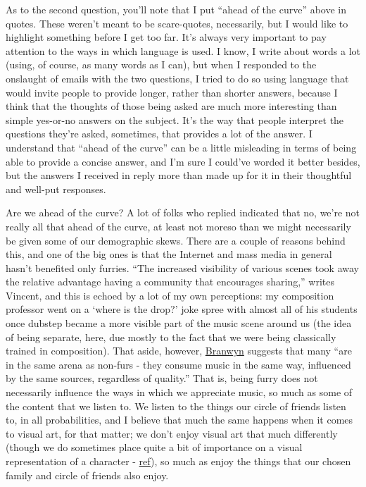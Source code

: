 As to the second question, you'll note that I put ``ahead of the curve''
above in quotes. These weren't meant to be scare-quotes, necessarily,
but I would like to highlight something before I get too far. It's
always very important to pay attention to the ways in which language is
used. I know, I write about words a lot (using, of course, as many words
as I can), but when I responded to the onslaught of emails with the two
questions, I tried to do so using language that would invite people to
provide longer, rather than shorter answers, because I think that the
thoughts of those being asked are much more interesting than simple
yes-or-no answers on the subject. It's the way that people interpret the
questions they're asked, sometimes, that provides a lot of the answer. I
understand that ``ahead of the curve'' can be a little misleading in
terms of being able to provide a concise answer, and I'm sure I could've
worded it better besides, but the answers I received in reply more than
made up for it in their thoughtful and well-put responses.

Are we ahead of the curve? A lot of folks who replied indicated that no,
we're not really all that ahead of the curve, at least not moreso than
we might necessarily be given some of our demographic skews. There are a
couple of reasons behind this, and one of the big ones is that the
Internet and mass media in general hasn't benefited only furries. ``The
increased visibility of various scenes took away the relative advantage
having a community that encourages sharing,'' writes Vincent, and this
is echoed by a lot of my own perceptions: my composition professor went
on a `where is the drop?' joke spree with almost all of his students
once dubstep became a more visible part of the music scene around us
(the idea of being separate, here, due mostly to the fact that we were
being classically trained in composition). That aside, however,
\href{http://www.lionhearted.ca/music.htm}{Branwyn} suggests that many
``are in the same arena as non-furs - they consume music in the same
way, influenced by the same sources, regardless of quality.'' That is,
being furry does not necessarily influence the ways in which we
appreciate music, so much as some of the content that we listen to. We
listen to the things our circle of friends listen to, in all
probabilities, and I believe that much the same happens when it comes to
visual art, for that matter; we don't enjoy visual art that much
differently (though we do sometimes place quite a bit of importance on a
visual representation of a character -
\href{http://adjectivespecies.com/2011/11/23/character-versus-self/}{ref}),
so much as enjoy the things that our chosen family and circle of friends
also enjoy.


